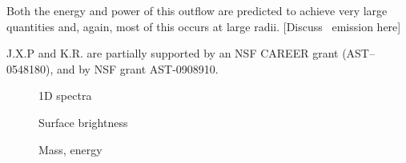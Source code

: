 \documentclass[12pt,preprint]{aastex}
\begin{document}
Both the energy and power of this outflow are predicted to achieve
very large quantities and, again, most of this occurs at large radii.
[Discuss \lya\ emission here]

\acknowledgments

J.X.P and K.R. are partially supported
by an NSF CAREER grant (AST--0548180), and 
by NSF grant AST-0908910.

\clearpage

%
%



\clearpage

%

\begin{figure}
\caption{
1D spectra
}
\label{fig:1D}
\end{figure}

\begin{figure}
\caption{
Surface brightness
}
\label{fig:SB}
\end{figure}

\begin{figure}
\caption{
Mass, energy
}
\label{fig:mass_energy}
\end{figure}
\end{document}

